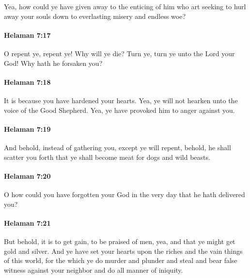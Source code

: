 			Yea, how could ye have given away to the enticing of him
			who art seeking to hurl away your souls
			down to everlasting misery and endless woe?

		\paragraph{Helaman 7:17} %
			\label{HELAMAN-7-17}

			O repent ye, repent ye!
			Why will ye die?
			Turn ye, turn ye unto the Lord your God!
			Why hath he forsaken you?

		\paragraph{Helaman 7:18} %
			\label{HELAMAN-7-18}

			It is because you have hardened your hearts.
			Yea, ye will not hearken unto the voice of the Good Shepherd.
			Yea, ye have provoked him to anger against you.

		\paragraph{Helaman 7:19} %
			\label{HELAMAN-7-19}

			And behold, instead of gathering you,
			except ye will repent,
			behold, he shall scatter you forth
			that ye shall become meat for dogs and wild beasts.

		\paragraph{Helaman 7:20} %
			\label{HELAMAN-7-20}

			O how could you have forgotten your God
			in the very day that he hath delivered you?

		\paragraph{Helaman 7:21} %
			\label{HELAMAN-7-21}

			But behold, it is to get gain, to be praised of men,
			yea, and that ye might get gold and silver.
			And ye have set your hearts upon the riches and the vain things of this world,
			for the which ye do murder and plunder and steal
			and bear false witness against your neighbor
			and do all manner of iniquity.

